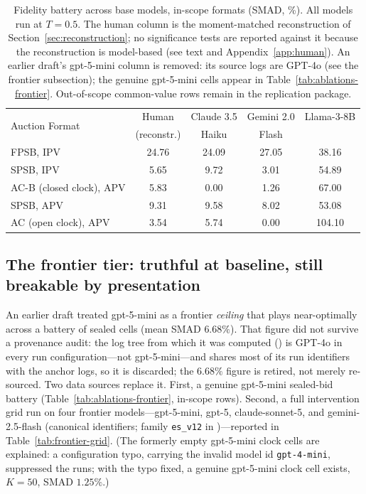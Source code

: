 \begin{table}[htbp]
\centering
\begin{tabular}{l|c|ccc}
\hline
\multirow{2}{*}{Auction Format} & Human & Claude 3.5 & Gemini 2.0 & Llama-3-8B \\
 & (reconstr.) & Haiku & Flash & \\
\hline
FPSB, IPV & 24.76 & 24.09 & 27.05 & 38.16 \\
SPSB, IPV & 5.65 & 9.72 & 3.01 & 54.89 \\
AC-B (closed clock), APV & 5.83 & 0.00 & 1.26 & 67.00 \\
SPSB, APV & 9.31 & 9.58 & 8.02 & 53.08 \\
AC (open clock), APV & 3.54 & 5.74 & 0.00 & 104.10 \\
\hline
\end{tabular}
\caption{Fidelity battery across base models, in-scope formats (SMAD, \%). All models run at $T=0.5$. The human column is the moment-matched reconstruction of Section~\ref{sec:reconstruction}; no significance tests are reported against it because the reconstruction is model-based (see text and Appendix~\ref{app:human}). An earlier draft's gpt-5-mini column is removed: its source logs are GPT-4o (see the frontier subsection); the genuine gpt-5-mini cells appear in Table~\ref{tab:ablations-frontier}. Out-of-scope common-value rows remain in the replication package.}
\label{tab:models}
\end{table}

\subsection{The frontier tier: truthful at baseline, still breakable by presentation}\label{app:ablations-frontier}

An earlier draft treated gpt-5-mini as a frontier \emph{ceiling} that plays near-optimally across a battery of sealed cells (mean SMAD $6.68\%$). That figure did not survive a provenance audit: the log tree from which it was computed () is GPT-4o in every run configuration---not gpt-5-mini---and shares most of its run identifiers with the anchor logs, so it is discarded; the $6.68\%$ figure is retired, not merely re-sourced. Two data sources replace it. First, a genuine gpt-5-mini sealed-bid battery (Table~\ref{tab:ablations-frontier}, in-scope rows). Second, a full intervention grid run on four frontier models---gpt-5-mini, gpt-5, claude-sonnet-5, and gemini-2.5-flash (canonical identifiers; family \texttt{es\_v12} in )---reported in Table~\ref{tab:frontier-grid}. (The formerly empty gpt-5-mini clock cells are explained: a configuration typo,  carrying the invalid model id \texttt{gpt-4-mini}, suppressed the runs; with the typo fixed, a genuine gpt-5-mini clock cell exists, $K=50$, SMAD $1.25\%$.)

